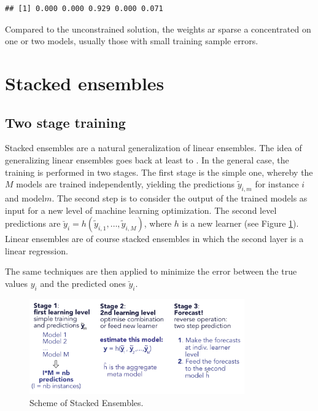 \documentclass[]{krantz}
\theoremstyle{definition}
\theoremstyle{definition}
\theoremstyle{definition}
\theoremstyle{remark}
\begin{document}
\begin{verbatim}
## [1] 0.000 0.000 0.929 0.000 0.071
\end{verbatim}

\normalsize

Compared to the unconstrained solution, the weights ar sparse a
concentrated on one or two models, usually those with small training
sample errors.

\hypertarget{stacked-ensembles}{%
\section{Stacked ensembles}\label{stacked-ensembles}}

\hypertarget{two-stage-training}{%
\subsection{Two stage training}\label{two-stage-training}}

Stacked ensembles are a natural generalization of linear ensembles. The
idea of generalizing linear ensembles goes back at least to
\citet{wolpert1992stacked}. In the general case, the training is
performed in two stages. The first stage is the simple one, whereby the
\(M\) models are trained independently, yielding the predictions
\(\tilde{y}_{i,m}\) for instance \(i\) and model\(m\). The second step
is to consider the output of the trained models as input for a new level
of machine learning optimization. The second level predictions are
\(\breve{y}_i=h(\tilde{y}_{i,1},\dots,\tilde{y}_{i,M})\), where \(h\) is
a new learner (see Figure \ref{fig:stackscheme}). Linear ensembles are
of course stacked ensembles in which the second layer is a linear
regression.

The same techniques are then applied to minimize the error between the
true values \(y_i\) and the predicted ones \(\breve{y}_i\).

\begin{figure}[H]

{\centering \includegraphics[width=350px]{images/stack} 

}

\caption{Scheme of Stacked Ensembles.}\label{fig:stackscheme}
\end{figure}
\end{document}
